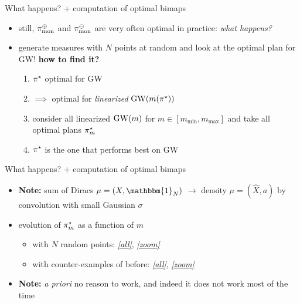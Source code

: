 \documentclass[9pt,xcolor={dvipsnames}]{beamer}
\begin{document}
\begin{frame}{What happens? + computation of optimal bimaps}
    \begin{itemize}
        \item still, $\pi_\text{mon}^\oplus$ and $\pi_\text{mon}^\ominus$ are very often optimal in practice: \emph{what happens?}
        \item generate measures with $N$ points at random and look at the optimal plan for GW! \textbf{how to find it?}\begin{enumerate}
            \item $\pi^\star$ optimal for GW \item $\implies$ optimal for \emph{linearized} $\operatorname{GW}(m(\pi^\star))$
            \item consider all linearized $\operatorname{GW}(m)$ for $m \in [m_\text{min},m_\text{max}]$ and take all optimal plans $\pi^\star_m$ 
            \item $\pi^\star$ is the one that performs best on GW
        \end{enumerate}
        \pause
    \end{itemize}
\end{frame}
\begin{frame}{What happens? + computation of optimal bimaps}
    \begin{itemize}
        \item \textbf{Note:} sum of Diracs $\mu=(X,\mathbbm{1}_N)$ $\to$ density $\mu=(\hat X,a)$ by convolution with small Gaussian $\sigma$
        \item evolution of $\pi^\star_m$ as a function of $m$
        \begin{itemize}
            \item with $N$ random points: \href{./figures/gif_random_full.gif}{\emph{[all]}}, \href{./figures/gif_random_zoom.gif}{\emph{[zoom]}}
            \pause
            \item with counter-examples of before: \href{./figures/gif_full.gif}{\emph{[all]}}, \href{./figures/gif_zoom.gif}{\emph{[zoom]}}
        \end{itemize}
        \item \textbf{Note:} \textit{a priori} no reason to work, and indeed it does not work most of the time
    \end{itemize}
\end{frame}
\end{document}
